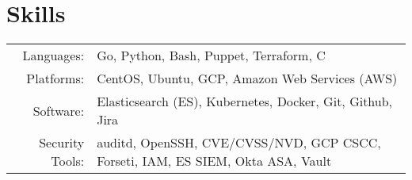 \documentclass[letterpaper]{article}
\begin{document}

\section*{Skills}
\begin{tabular}{rl}
    Languages: & Go, Python, Bash, Puppet, Terraform, C\\
    Platforms: & CentOS, Ubuntu, GCP, Amazon Web Services (AWS)\\
	Software: & Elasticsearch (ES), Kubernetes, Docker, Git, Github, Jira\\
	Security Tools: & auditd, OpenSSH, CVE/CVSS/NVD, GCP CSCC, Forseti, IAM, ES SIEM, Okta ASA, Vault
\end{tabular}
\end{document}
